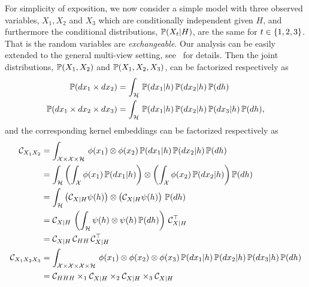 \documentclass{article}
\begin{document}
For simplicity of exposition, we now consider a simple model with three observed variables, $X_1, X_2$ and $X_3$ which are conditionally independent given $H$, and furthermore the conditional distributions, $\mathbb{P}(X_t|H)$, are the same for $t \in \left\{1,2,3\right\}$. That is the random variables are {\em exchangeable}. Our analysis can be easily extended to the general multi-view setting, see~\cite{AnandkumarEtal:tensor12} for details. Then the joint distributions, $\mathbb{P}(X_1,X_2)$ and $\mathbb{P}(X_1,X_2,X_3)$, can be factorized respectively as
\begin{align}
 \mathbb{P}(dx_1 \times dx_2) &= \int_{\mathcal{H}}\, \mathbb{P}(dx_1 | h )\, \mathbb{P}(d x_2 | h)\, \mathbb{P}(dh) \\
  \mathbb{P}(dx_1 \times dx_2\times dx_3) &= \int_{\mathcal{H}}\, \mathbb{P}(dx_1 | h )\, \mathbb{P}(dx_2 | h)\, \mathbb{P}(dx_3 | h)\, \mathbb{P}(dh),
\end{align}
and the corresponding kernel embeddings can be factorized respectively as
\begin{align}
  \mathcal{C}_{X_1X_2}
  &= \int_{\mathcal{X}\times \mathcal{X} \times \mathcal{H}}\, \phi(x_1) \otimes \phi(x_2)\, \mathbb{P}(dx_1 | h )\, \mathbb{P}(dx_2 | h)\, \mathbb{P}(dh) \\
  &= \int_{\mathcal{H}} \left(\int_{\mathcal{X}} \phi(x_1)\, \mathbb{P}(dx_1|h)\right) \otimes \left(\int_{\mathcal{X}} \phi(x_2)\, \mathbb{P}(dx_2 |h)\right) \mathbb{P}(dh) \\
  &= \int_{\mathcal{H}} \left(\mathcal{C}_{X|H} \psi(h)\right) \otimes \left(\mathcal{C}_{X|H} \psi(h)\right)\, \mathbb{P}(dh) \\
  &= \mathcal{C}_{X|H}\, \left(\int_{\mathcal{H}} \psi(h) \otimes \psi(h)\, \mathbb{P}(dh)\right)\, \mathcal{C}_{X|H}^\top\\
  &= \mathcal{C}_{X|H}\, \mathcal{C}_{HH}\, \mathcal{C}_{X|H}^\top \\
  \mathcal{C}_{X_1 X_2 X_3}
  &= \int_{\mathcal{X}\times \mathcal{X} \times \mathcal{X} \times \mathcal{H}}\, \phi(x_1) \otimes \phi(x_2) \otimes \phi(x_3) \, \mathbb{P}(dx_1 | h )\, \mathbb{P}(dx_2 | h)\, \mathbb{P}(dx_3 | h)\,  \mathbb{P}(dh) \\
  &= \mathcal{C}_{HHH} \times_1 \mathcal{C}_{X|H} \times_2 \mathcal{C}_{X|H} \times_3 \mathcal{C}_{X|H}
\end{align}
\end{document}
